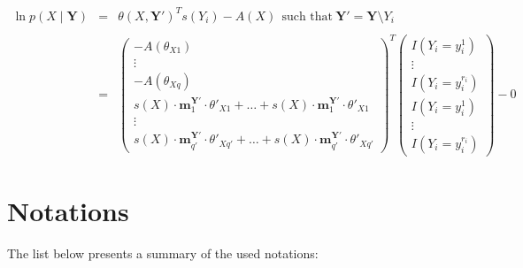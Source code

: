\documentclass[11pt, oneside]{article}   	%
\numberwithin{figure}{section}
\numberwithin{equation}{section}
\numberwithin{table}{section}
\theoremstyle{definition}
\begin{document}
\begin{appendices}
\begin{itemize}
\end{itemize}



\begin{eqnarray*}
\ln p(X\mid \mathbf{Y}) &=& \theta(X, \mathbf{Y'} )^T s(Y_i) - A(X) ~~\textrm{such~that} ~\mathbf{Y'} = \mathbf{Y} \setminus Y_i \\ \\
&=&
\begin{pmatrix}
- A(\theta_{X1}) \\
\vdots \\
- A(\theta_{Xq})\\
\! s(X) \cdot  \mathbf{m}^{\mathbf{Y'}}_1 \cdot \theta'_{X1}  +  \ldots + s(X) \cdot \mathbf{m}^{\mathbf{Y'}}_1 \cdot \theta'_{X1}\\
\vdots \\
\! s(X) \cdot  \mathbf{m}^{\mathbf{Y'}}_{q'} \cdot \theta'_{Xq'}   + \ldots + s(X) \cdot  \mathbf{m}^{\mathbf{Y'}}_{q'} \cdot \theta'_{Xq'}
\end{pmatrix}^T \!
\begin{pmatrix}
I(Y_i=y_i^1) \! \\
\vdots \\
I(Y_i=y_i^{r_i}) \!\\
I(Y_i=y_i^1) \! \\
\vdots \\
I(Y_i=y_i^{r_i}) \!
\end{pmatrix}
- 0 \!
\end{eqnarray*}


\newpage
\section*{Notations}

The list below presents a summary of the used notations:
\\


\end{appendices}
\end{document}
